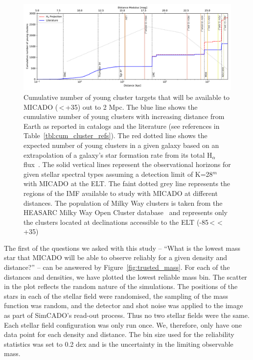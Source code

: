 \documentclass{aa}
\begin{document}
\begin{figure}

    \centering
    \includegraphics[width=\textwidth]{young_clusters_within_2Mpc_incl_MW.pdf}

    \caption{Cumulative number of young cluster targets that will be available to MICADO (\textdelta\,\textless\,+35\textdegree) out to 2 Mpc.
    The blue line shows the cumulative number of young clusters with increasing distance from Earth as reported in catalogs and the literature (see references in Table~\ref{tbl:cum_cluster_refs}).
    The red dotted line shows the expected number of young clusters in a given galaxy based on an extrapolation of a galaxy's star formation rate from its total H$_\alpha$ flux~\citep{caldwell09}.
    The solid vertical lines represent the observational horizons for given stellar spectral types assuming a detection limit of K=28$^m$ with MICADO at the ELT.
    The faint dotted grey line represents the regions of the IMF available to study with MICADO at different distances.
    The population of Milky Way clusters is taken from the HEASARC Milky Way Open Cluster database~\citep{heasarc_mwsc} and represents only the clusters located at declinations accessible to the ELT (-85\textdegree\,\textless\,\textdelta\,\textless\,+35\textdegree)
    }
    \label{fig:local_group_cluster_number}

\end{figure}


The first of the questions we asked with this study -- ``What is the lowest mass star that MICADO will be able to observe reliably for a given density and distance?'' -- can be answered by Figure~\ref{fig:trusted_mass}.
For each of the distances and densities, we have plotted the lowest reliable mass bin.
The scatter in the plot reflects the random nature of the simulations.
The positions of the stars in each of the stellar field were randomised, the sampling of the mass function was random, and the detector and shot noise was applied to the image as part of SimCADO's read-out process.
Thus no two stellar fields were the same.
Each stellar field configuration was only run once.
We, therefore, only have one data point for each density and distance.
The bin size used for the reliability statistics was set to 0.2 dex and is the uncertainty in the limiting observable mass.
\end{document}
